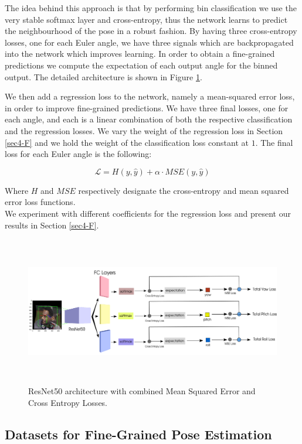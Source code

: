 \documentclass[10pt,twocolumn,letterpaper]{article}
\begin{document}
The idea behind this approach is that by performing bin classification we use the very stable softmax layer and cross-entropy, thus the network learns to predict the neighbourhood of the pose in a robust fashion. By having three cross-entropy losses, one for each Euler angle, we have three signals which are backpropagated into the network which improves learning. In order to obtain a fine-grained predictions we compute the expectation of each output angle for the binned output. The detailed architecture is shown in Figure \ref{architecture}.

We then add a regression loss to the network, namely a mean-squared error loss, in order to improve fine-grained predictions. We have three final losses, one for each angle, and each is a linear combination of both the respective classification and the regression losses. We vary the weight of the regression loss in Section \ref{sec4-F} and we hold the weight of the classification loss constant at $1$. The final loss for each Euler angle is the following:

\[\boldsymbol{\mathcal{L}}=H(y, \hat{y}) + \alpha \cdot MSE(y,\hat{y}) \]

Where $H$ and $MSE$ respectively designate the cross-entropy and mean squared error loss functions.\\

We experiment with different coefficients for the regression loss and present our results in Section \ref{sec4-F}.

\begin{figure}
  \includegraphics[width=\textwidth,height=6.5cm]{architecture.png}
  \caption{ResNet50 architecture with combined Mean Squared Error and Cross Entropy Losses.}
  \label{architecture}
\end{figure}

\subsection{Datasets for Fine-Grained Pose Estimation}\label{sec3-C}
\end{document}
